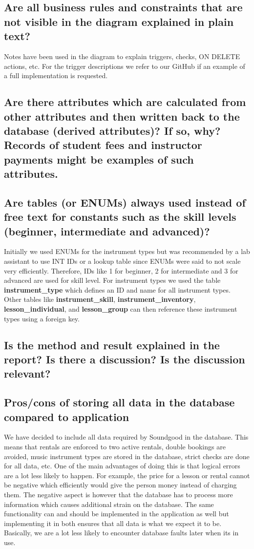 \documentclass[a4paper]{scrartcl}
\begin{document}
\subsection{Are all business rules and constraints that are not visible in the diagram explained in plain text?}
Notes have been used in the diagram to explain triggers, checks, ON DELETE actions, etc. For the trigger descriptions we refer to our GitHub if an example of a full implementation is requested.

\subsection{Are there attributes which are calculated from other attributes and then written back to the database (derived attributes)? If so, why? Records of student fees and instructor payments might be examples of such attributes.}


\subsection{Are tables (or ENUMs) always used instead of free text for constants such as the skill levels (beginner, intermediate and advanced)?}
Initially we used ENUMs for the instrument types but was recommended by a lab assistant to use INT IDs or a lookup table since ENUMs were said to not scale very efficiently. Therefore, IDs like 1 for beginner, 2 for intermediate and 3 for advanced are used for skill level. For instrument types we used the table \textbf{instrument\_type} which defines an ID and name for all instrument types. Other tables like \textbf{instrument\_skill}, \textbf{instrument\_inventory}, \textbf{lesson\_individual}, and \textbf{lesson\_group} can then reference these instrument types using a foreign key.

\subsection{Is the method and result explained in the report? Is there a discussion? Is the discussion relevant?}


\subsection{Pros/cons of storing all data in the database compared to application}
We have decided to include all data required by Soundgood in the database. This means that rentals are enforced to two active rentals, double bookings are avoided, music instrument types are stored in the database, strict checks are done for all data, etc. One of the main advantages of doing this is that logical errors are a lot less likely to happen. For example, the price for a lesson or rental cannot be negative which efficiently would give the person money instead of charging them. The negative aspect is however that the database has to process more information which causes additional strain on the database. The same functionality can and should be implemented in the application as well but implementing it in both ensures that all data is what we expect it to be. Basically, we are a lot less likely to encounter database faults later when its in use.
\end{document}

